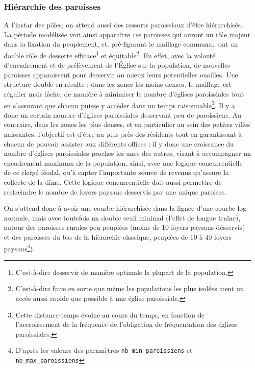 \clearpage

\subsubsection{Hiérarchie des paroisses}\label{par:hierarchie-paroisses}

A l'instar des pôles, on attend aussi des ressorts paroissiaux d'être hiérarchisés.
La période modélisée voit ainsi apparaître ces paroisses qui auront un rôle majeur dans la fixation du peuplement, et, pré-figurant le maillage communal, ont un double rôle de desserte efficace\footnote{C'est-à-dire desservir de manière optimale la plupart de la population.} et équitable\footnote{C'est-à-dire faire en sorte que même les populations les plus isolées aient un accès aussi rapide que possible à une église paroissiale.}.
En effet, avec la volonté d'encadrement et de prélèvement de l'Église sur la population, de nouvelles paroisses apparaissent pour desservir au mieux leurs potentielles ouailles.
Une structure double en résulte :
dans les zones les moins denses, le maillage est régulier mais lâche, de manière à minimiser le nombre d'églises paroissiales tout en s'assurant que chacun puisse y accéder dans un temps raisonnable\footnote{Cette distance-temps évolue au cours du temps, en fonction de l'accroissement de la fréquence de l'obligation de fréquentation des églises paroissiales.}.
Il y a donc un certain nombre d'églises paroissiales desservant peu de paroissiens.
Au contraire, dans les zones les plus denses, et en particulier au sein des petites villes naissantes, l'objectif est d'être au plus près des résidents tout en garantissant à chacun de pouvoir assister aux différents offices :
il y donc une croissance du nombre d'églises paroissiales proches les unes des autres, visant à accompagner un encadrement maximum de la population, ainsi, avec une logique concurrentielle de ce clergé féodal, qu'à capter l'importante source de revenus qu'assure la collecte de la dîme.
Cette logique concurrentielle doit aussi permettre de restreindre le nombre de foyers paysans desservis par une unique paroisse.

On s'attend donc à avoir une courbe hiérarchisée dans la lignée d'une courbe log-normale, mais avec toutefois un double seuil minimal (l'effet de \og longue traîne\fg{}), autour des paroisses \og rurales\fg{} peu peuplées (moins de 10 foyers paysans désservis) et des paroisses du bas de la hiérarchie classique, peuplées de 10 à 40 foyers paysans\footnote{D'après les valeurs des paramètres \texttt{nb\_min\_paroissiens} et \texttt{nb\_max\_paroissiens}}).

